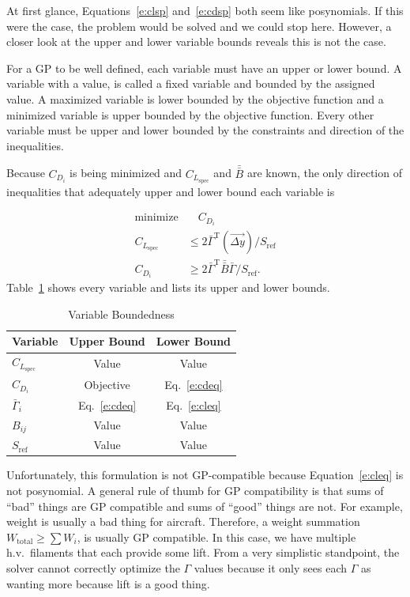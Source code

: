 \documentclass[10pt, a4paper]{article}
\begin{document}
At first glance, Equations~\ref{e:clsp} and~\ref{e:cdsp} both seem like posynomials.  
If this were the case, the problem would be solved and we could stop here.  
However, a closer look at the upper and lower variable bounds reveals this is not the case. 

For a GP to be well defined, each variable must have an upper or lower bound.
A variable with a value, is called a fixed variable and bounded by the assigned value.  
A maximized variable is lower bounded by the objective function and a minimized variable is upper bounded by the objective function. 
Every other variable must be upper and lower bounded by the constraints and direction of the inequalities.  

Because $C_{D_i}$ is being minimized and $C_{L_{\mathrm{spec}}}$ and $\bar{\bar{B}}$ are known, the only direction of inequalities that adequately upper and lower bound each variable is

\begin{align}
    \text{minimize} & \quad C_{D_i} \nonumber \\
    \label{e:cleq}
    C_{L_{\mathrm{spec}}} &\leq 2 \bar{\Gamma}^{\mathrm{T}} (\vec{\Delta y})/S_{\mathrm{ref}} \\
    \label{e:cdeq}
    C_{D_i} &\geq 2 \bar{\Gamma}^{\mathrm{T}} \bar{\bar{B}} \bar{\Gamma}/S_{\mathrm{ref}}.
\end{align}
Table~\ref{t:bounds} shows every variable and lists its upper and lower bounds. 

\begin{longtable}{lcc}
\caption{Variable Boundedness}\\
\toprule
\toprule
\label{t:bounds}
Variable                    & Upper Bound       & Lower Bound      \\ \midrule
$C_{L_{\mathrm{spec}}}$     & Value             & Value            \\
$C_{D_i}$                   & Objective         & Eq.~\ref{e:cdeq} \\
$\bar{\Gamma}_i$            & Eq.~\ref{e:cdeq}  & Eq.~\ref{e:cleq} \\
$B_{ij}$                    & Value             & Value            \\
$S_{\mathrm{ref}}$          & Value             & Value            \\
\bottomrule
\end{longtable}

Unfortunately, this formulation is not GP-compatible because Equation~\ref{e:cleq} is not posynomial.  
A general rule of thumb for GP compatibility is that sums of ``bad'' things are GP compatible and sums of ``good'' things are not.  
For example, weight is usually a bad thing for aircraft.  Therefore, a weight summation $W_{\mathrm{total}} \geq \sum W_i$, is usually GP compatible. 
In this case, we have multiple h.v.\ filaments that each provide some lift.  
From a very simplistic standpoint, the solver cannot correctly optimize the $\Gamma$ values because it only sees each $\Gamma$ as wanting more because lift is a good thing. 
\end{document}
